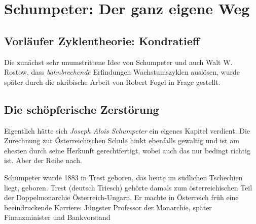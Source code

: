 %
%
%

\chapter{Schumpeter: Der ganz eigene Weg}
\label{Schumpeter}

\section{Vorläufer Zyklentheorie: Kondratieff}

Die zunächst sehr unumstrittene Idee von Schumpeter und auch Walt W. Rostow, dass \textit{bahnbrechende} Erfindungen Wachstumszyklen auslösen, wurde später durch die akribische Arbeit von Robert Fogel in Frage gestellt. 

\section{Die schöpferische Zerstörung}
Eigentlich hätte sich \textit{Joseph Alois Schumpeter} ein eigenes Kapitel verdient. Die Zurechnung zur Österreichischen Schule hinkt ebenfalls gewaltig und ist am ehesten durch seine Herkunft gerechtfertigt, wobei auch das nur bedingt richtig ist. Aber der Reihe nach.

Schumpeter wurde 1883 in Trest geboren, das heute im südlichen Tschechien liegt, geboren. Trest (deutsch Triesch) gehörte damals zum österreichischen Teil der Doppelmonarchie Österreich-Ungarn. Er machte in Österreich früh eine beeindruckende Karriere: Jüngster Professor der Monarchie, später Finanzminister und Bankvorstand

